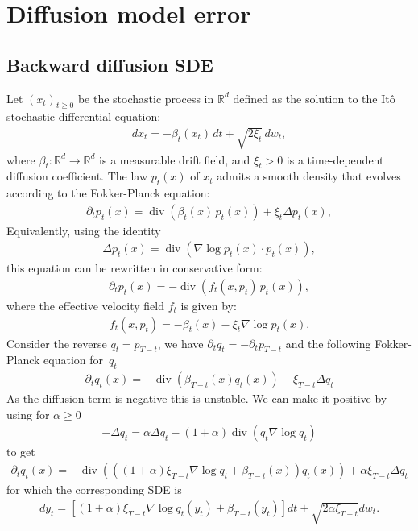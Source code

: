 \documentclass[11pt]{article}
\begin{document}
\section{Diffusion model error}

\subsection{Backward diffusion SDE}
\label{app:reverse}
Let \( (x_t)_{t \geq 0} \) be the stochastic process in \( \mathbb{R}^d \) defined as the solution to the Itô stochastic differential equation:
\begin{align*}
    dx_t = -\beta_t(x_t)\,dt + \sqrt{2 \xi_t}\,dw_t,
\end{align*}
where \( \beta_t : \mathbb{R}^d \to \mathbb{R}^d \) is a measurable drift field,
and \( \xi_t > 0 \) is a time-dependent diffusion coefficient. The law \( p_t(x) \) of \( x_t \) admits a smooth density that evolves according to the Fokker-Planck equation:
\begin{align*}
\partial_t p_t(x) = \operatorname{div} \left( \beta_t(x)\, p_t(x) \right) + \xi_t \Delta p_t(x),
\end{align*}
Equivalently, using the identity
\begin{align*}
\Delta p_t(x) = \operatorname{div} \left( \nabla \log p_t(x) \cdot p_t(x) \right),
\end{align*}
this equation can be rewritten in conservative form:
\begin{align*}
\partial_t p_t(x) = -\operatorname{div} \left( f_t(x, p_t)\, p_t(x) \right),
\end{align*}
where the effective velocity field \( f_t \) is given by:
\begin{align*}
f_t(x, p_t) = -\beta_t(x) - \xi_t \nabla \log p_t(x).
\end{align*}
Consider the reverse $q_t = p_{T-t}$, we have 
$ \partial_t q_t = - \partial_t p_{T-t} $ and the following Fokker-Planck equation for~$q_t$
\begin{align*}
\partial_t q_t(x) = -\operatorname{div}(\beta_{T-t}(x)q_t(x)) - \xi_{T-t}\Delta q_t 
\end{align*}
As the diffusion term is negative this is unstable. We can make it positive by using for $\alpha \geq 0$
\begin{align*}
- \Delta q_t = \alpha \Delta q_t - (1+\alpha)\operatorname{div}( q_t \nabla \log q_t) \end{align*}
to get
\begin{align*}\partial_t q_t(x) = -\operatorname{div} \left(\left((1+\alpha)\xi_{T-t}\nabla \log q_t + \beta_{T-t}(x)\right)q_t(x)\right) + \alpha \xi_{T-t} \Delta q_t
\end{align*}
for which the corresponding SDE is 
\begin{align*}dy_t = [(1+\alpha)\xi_{T-t} \nabla \log q_t(y_t) + \beta_{T-t}(y_t)]dt + \sqrt{2\alpha \xi_{T-t}} dw_t.
\end{align*}
\end{document}
